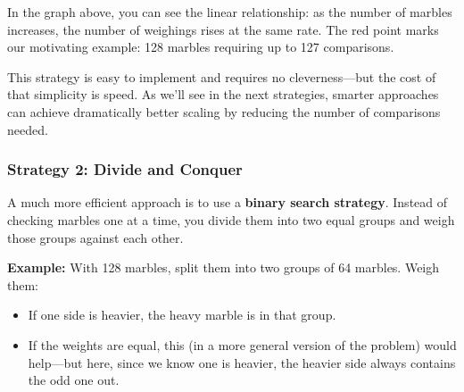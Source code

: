 \begin{center}
\end{center}



\noindent In the graph above, you can see the linear relationship: as the number of marbles increases, the number of weighings rises at the same rate. The red point marks our motivating example: 128 marbles requiring up to 127 comparisons.

This strategy is easy to implement and requires no cleverness—but the cost of that simplicity is speed. As we'll see in the next strategies, smarter approaches can achieve dramatically better scaling by reducing the number of comparisons needed.


\subsubsection{Strategy 2: Divide and Conquer}

A much more efficient approach is to use a \textbf{binary search strategy}. Instead of checking marbles one at a time, you divide them into two equal groups and weigh those groups against each other.

\medskip

\noindent\textbf{Example:} With 128 marbles, split them into two groups of 64 marbles. Weigh them:
\begin{itemize}
  \item If one side is heavier, the heavy marble is in that group.
  \item If the weights are equal, this (in a more general version of the problem) would help—but here, since we know one is heavier, the heavier side always contains the odd one out.
\end{itemize}

